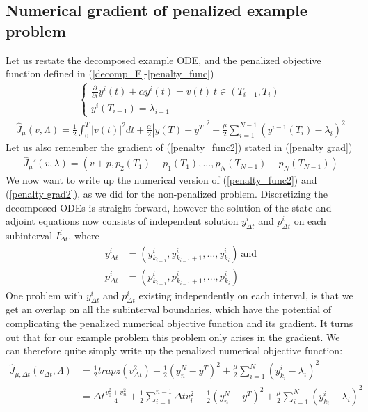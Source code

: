 \subsection{Numerical gradient of penalized example problem}
Let us restate the decomposed example ODE, and the penalized objective function defined in (\ref{decomp_E}-\ref{penalty_func})
\begin{align}
\left\{
     \begin{array}{lr}
       	\frac{\partial}{\partial t} y^i(t)+\alpha y^i(t) = v(t) \ t\in(T_{i-1},T_{i})\\
       	y^i(T_{i-1})=\lambda_{i-1}
     \end{array}
   \right. \label{decomp_E2}
\end{align}
\begin{align}
\hat J_{\mu}(v,\Lambda) = \frac{1}{2}\int_0^T|v(t)|^2dt + \frac{\alpha}{2}|y(T)-y^T|^2 + \frac{\mu}{2}\sum_{i=1}^{N-1}(y^{i-1}(T_i)-\lambda_i)^2 \label{penalty_func2}
\end{align}
Let us also remember the gradient of (\ref{penalty_func2}) stated in (\ref{penalty grad})
\begin{align}
\hat J_{\mu}'(v,\lambda) = (v+p,p_{2}(T_1) -p_{1}(T_1),..., p_{N}(T_{N-1}) -p_{N}(T_{N-1})) \label{penalty grad2}
\end{align}
We now want to write up the numerical version of (\ref{penalty_func2}) and (\ref{penalty grad2}), as we did for the non-penalized problem. Discretizing the decomposed ODEs is straight forward, however the solution of the state and adjoint equations now consists of independent solution $y_{\Delta t}^i$ and $p_{\Delta t}^i$ on each subinterval $I_{\Delta t}^i$, where 
\begin{align*}
y_{\Delta t}^i &= (y_{k_{i-1}}^i,y_{k_{i-1}+1}^i,...,y_{k_{i}}^i) \ \text{and} \\
p_{\Delta t}^i &= (p_{k_{i-1}}^i,p_{k_{i-1}+1}^i,...,p_{k_{i}}^i)
\end{align*} 
One problem with $y_{\Delta t}^i$ and $p_{\Delta t}^i$ existing independently on each interval, is that we get an overlap on all the subinterval boundaries, which have the potential of complicating the penalized numerical objective function and its gradient. It turns out that for our example problem this problem only arises in the gradient. We can therefore quite simply write up the penalized numerical objective function:
\begin{align}
\hat J_{\mu,\Delta t}(v_{\Delta t},\Lambda)&=\frac{1}{2} trapz(v_{\Delta t}^2)+ \frac{1}{2}(y_n^{N}-y^T)^2 +\frac{\mu }{2}\sum_{i=1}^{N} (y_{k_i}^{i}-\lambda_i)^2\\
&=\Delta t\frac{v_0^2+v_n^2}{4} + \frac{1}{2}\sum_{i=1}^{n-1} \Delta t v_i^2 + \frac{1}{2}(y_n^N-y^T)^2+\frac{\mu }{2}\sum_{i=1}^{N} (y_{k_i}^{i}-\lambda_i)^2 \label{pen disc f}
\end{align}
